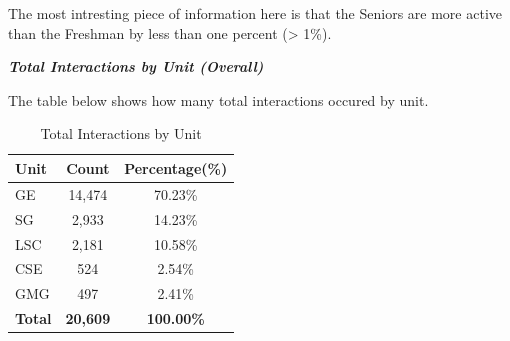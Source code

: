 \documentclass[
  letterpaper,
  DIV=11,
  numbers=noendperiod]{scrartcl}
\begin{document}
\begin{table}[!h]
\centering
\caption{\label{tab:Overall Class Standing Table}Unique Student Interactions by Class Standing}
\centering
{}
\end{table}

The most intresting piece of information here is that the Seniors are
more active than the Freshman by less than one percent (\textgreater{}
1\%).

\raggedright

\textsf{\textbf{\textit{Total Interactions by Unit (Overall)}}}

\noindent The table below shows how many total interactions occured by
unit.

\begin{longtable}[t]{lcc}
\caption{Total Interactions by Unit}\tabularnewline

\toprule
\textbf{Unit} & \textbf{Count} & \textbf{Percentage(\%)}\\
\midrule
GE & 14,474 & 70.23\%\\
SG & 2,933 & 14.23\%\\
LSC & 2,181 & 10.58\%\\
CSE & 524 & 2.54\%\\
GMG & 497 & 2.41\%\\
\midrule
\addlinespace
\textbf{Total} & \textbf{20,609} & \textbf{100.00\%}\\
\bottomrule
\end{longtable}
\end{document}
